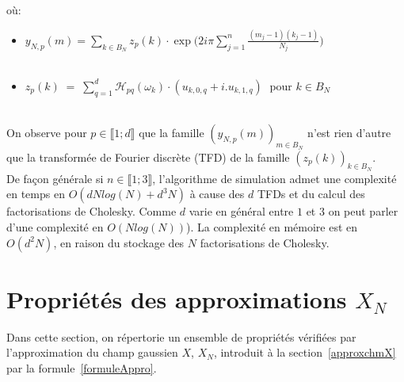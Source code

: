 \noindent où:
\begin{itemize}

\item $y_{N,p}(m) = \displaystyle\sum_{k \in B_N}  z_{p}(k) \cdot \exp \biggl(2i\pi \displaystyle\sum_{j = 1}^{n} \frac{(m_j - 1)(k_j -1)}{N_j} \biggr)$\\
~\\
\item $z_{p}(k) \; = \; \displaystyle\sum_{q = 1}^{d} \mathcal{H}_{pq}(\omega_k) \cdot (u_{k,0,q} + i.u_{k,1,q}) \;$ pour $k \in B_N$\\
\end{itemize}
~\\
On observe pour $p \in \llbracket 1;d \rrbracket$ que la famille $(y_{N,p}(m))_{m \in B_N}$ n'est rien d'autre que
la transformée de Fourier discrète (TFD) de la famille $(z_{p}(k))_{k \in B_N}$.\\
De façon générale si $n \in \llbracket 1;3 \rrbracket$, l'algorithme de simulation admet une complexité en temps en $O(d Nlog(N)+d^3 N)$ à cause 
des $d$ TFDs et du calcul des factorisations de Cholesky. Comme $d$ varie en général entre $1$ et $3$
on peut parler d'une complexité en $O(Nlog(N))$). La complexité en mémoire est en  $O(d^2 N)$, en raison du
stockage des $N$ factorisations de Cholesky. 


\section{Propriétés des approximations $X_N$}

Dans cette section, on répertorie un ensemble de propriétés vérifiées
par l'approximation du champ gaussien $X$, $X_N$, introduit à la section~\ref{approxchmX} par la formule~\ref{formuleAppro}.\\

